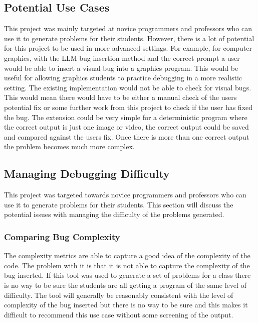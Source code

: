 \documentclass[12pt]{extarticle}
\begin{document}
\subsection{Potential Use Cases}

This project was mainly targeted at novice programmers and professors who can use it to generate problems for their students. However, there is a lot of potential for this project to be used in more advanced settings. For example, for computer graphics, with the LLM bug insertion method and the correct prompt a user would be able to insert a visual bug into a graphics program. This would be useful for allowing graphics students to practice debugging in a more realistic setting. The existing implementation would not be able to check for visual bugs. This would mean there would have to be either a manual check of the users potential fix or some further work from this project to check if the user has fixed the bug. The extension could be very simple for a deterministic program where the correct output is just one image or video, the correct output could be saved and compared against the users fix. Once there is more than one correct output the problem becomes much more complex.


\subsection{Managing Debugging Difficulty}

This project was targeted towards novice programmers and professors who can use it to generate problems for their students. This section will discuss the potential issues with managing the difficulty of the problems generated.

\subsubsection{Comparing Bug Complexity}

The complexity metrics are able to capture a good idea of the complexity of the code. The problem with it is that it is not able to capture the complexity of the bug inserted. If this tool was used to generate a set of problems for a class there is no way to be sure the students are all getting a program of the same level of difficulty. The tool will generally be reasonably consistent with the level of complexity of the bug inserted but there is no way to be sure and this makes it difficult to recommend this use case without some screening of the output.
\end{document}
